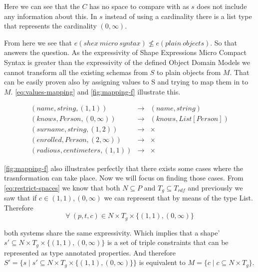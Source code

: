 Here we can see that the $C$ has no space to compare with as $s$ does not include any information about this.
In $s$ instead of using a cardinality there is a list type that represents the cardinality $(0, \infty)$.

From here we see that $e(shex\ micro\ syntax) \not\leq e(plain\ objects)$. So that answers the question.
As the expressivity of Shape Expressions Micro Compact Syntax is greater than the expressivity of the
defined Object Domain Models we cannot transform all the existing schemas from $S$ to plain objects from $M$.
That can be easily proven also by assigning values to S and trying to map them in to $M$. \cref{eq:values-mapping}
and \cref{fig:mapping-f} illustrate this.

\begin{equation}\label{eq:values-mapping}
    \begin{aligned}
(name,string,(1,1)) & \rightarrow & (name,string)\\
(knows,Person,(0,\infty)) & \rightarrow & (knows,List[Person])\\
(surname,string,(1,2)) & \rightarrow & \times \\
(enrolled,Person,(2,\infty)) & \rightarrow & \times \\
(radious,centimeters,(1,1)) & \rightarrow & \times  
    \end{aligned}
\end{equation}

\cref{fig:mapping-f} also illustrates perfectly that there exists some cases where the trasnformation can take
place. Now we will focus on finding those cases. From \cref{eq:restrict-spaces} we know that both $N \subseteq P$
and $T_g \subseteq T_{rdf}$ and previously we saw that if $c \in {(1,1), (0,\infty)}$ we can represent that by means
of the type List. Therefore
\begin{equation}\label{eq:restriction}
    \forall\ (p,t,c) \in N \times T_g \times \{(1,1),(0,\infty)\}   
\end{equation}

both systems share the same expressivity. Which implies that a shape' $s' \subseteq N \times T_g \times \{(1,1),(0,\infty)\}$
is a set of triple constraints that can be represented as type annotated properties. And therefore
$S'=\{s \mid s' \subseteq N \times T_g \times \{(1,1),(0,\infty)\} \}$ is equivalent to $M = \{ c \mid c \subseteq N \times T_{g} \}$.